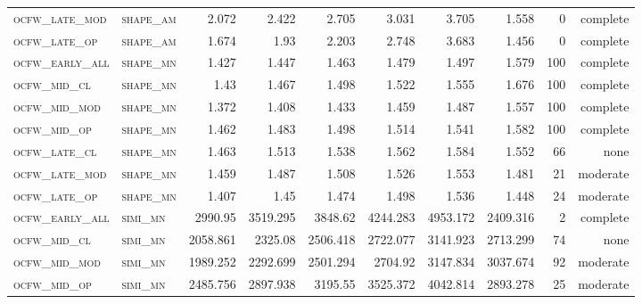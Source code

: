 \begin{landscape}
\begin{center}
\begin{footnotesize}
\begin{longtable}{llrrrrr|rrr}
\textsc{ocfw\_late\_mod } & \textsc{shape\_am }    & 2.072    & 2.422    & 2.705    & 3.031    & 3.705      & 1.558         & 0             & complete            \\
\textsc{ocfw\_late\_op  } & \textsc{shape\_am }    & 1.674    & 1.93     & 2.203    & 2.748    & 3.683      & 1.456         & 0             & complete            \\
\textsc{ocfw\_early\_all} & \textsc{shape\_mn }    & 1.427    & 1.447    & 1.463    & 1.479    & 1.497      & 1.579         & 100           & complete             \\
\textsc{ocfw\_mid\_cl   } & \textsc{shape\_mn }    & 1.43     & 1.467    & 1.498    & 1.522    & 1.555      & 1.676         & 100           & complete             \\
\textsc{ocfw\_mid\_mod  } & \textsc{shape\_mn }    & 1.372    & 1.408    & 1.433    & 1.459    & 1.487      & 1.557         & 100           & complete             \\
\textsc{ocfw\_mid\_op   } & \textsc{shape\_mn }    & 1.462    & 1.483    & 1.498    & 1.514    & 1.541      & 1.582         & 100           & complete             \\
\textsc{ocfw\_late\_cl  } & \textsc{shape\_mn }    & 1.463    & 1.513    & 1.538    & 1.562    & 1.584      & 1.552         & 66            & none        \\
\textsc{ocfw\_late\_mod } & \textsc{shape\_mn }    & 1.459    & 1.487    & 1.508    & 1.526    & 1.553      & 1.481         & 21            & moderate        \\
\textsc{ocfw\_late\_op  } & \textsc{shape\_mn }    & 1.407    & 1.45     & 1.474    & 1.498    & 1.536      & 1.448         & 24            & moderate        \\
\textsc{ocfw\_early\_all} & \textsc{simi\_mn  }    & 2990.95  & 3519.295 & 3848.62  & 4244.283 & 4953.172   & 2409.316      & 2             & complete        \\
\textsc{ocfw\_mid\_cl   } & \textsc{simi\_mn  }    & 2058.861 & 2325.08  & 2506.418 & 2722.077 & 3141.923   & 2713.299      & 74            & none        \\
\textsc{ocfw\_mid\_mod  } & \textsc{simi\_mn  }    & 1989.252 & 2292.699 & 2501.294 & 2704.92  & 3147.834   & 3037.674      & 92            & moderate        \\
\textsc{ocfw\_mid\_op   } & \textsc{simi\_mn  }    & 2485.756 & 2897.938 & 3195.55  & 3525.372 & 4042.814   & 2893.278      & 25            & moderate        \\

\end{longtable}
\end{footnotesize}
\end{center}
\end{landscape}
